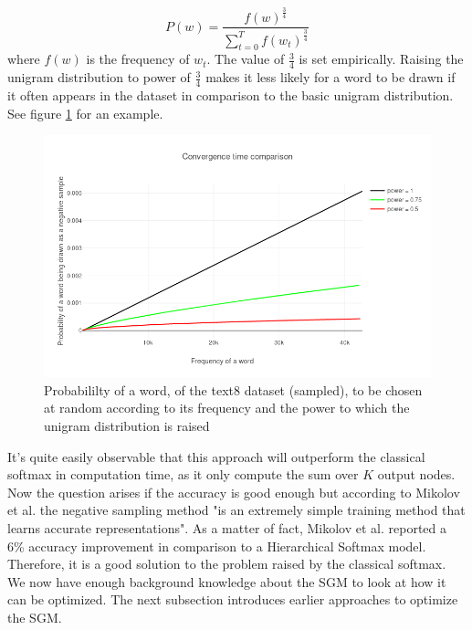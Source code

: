 \begin{equation} \label{eq:unigram}
P(w)=\frac{f(w)^{\frac{3}{4}}}{\sum_{t=0}^{T} f(w_t)^{\frac{3}{4}}}
\end{equation}
where $f(w)$ is the frequency of $w_t$. The value of $\frac{3}{4}$ is set empirically. Raising the unigram distribution to power of $\frac{3}{4}$ makes it less likely for a word to be drawn if it often appears in the dataset in comparison to the basic unigram distribution. See figure \ref{fig:frequency_ex} for an example.
\begin{figure}[ht]
\centering
\includegraphics[scale=0.30]{images/frequency_ex}
\caption{Probabililty of a word, of the text8 dataset (sampled), to be chosen at random according to its frequency and the power to which the unigram distribution is raised}
\label{fig:frequency_ex}
\end{figure}
It's quite easily observable that this approach will outperform the classical softmax in computation time, as it only compute the sum over $K$ output nodes. Now the question arises if the accuracy is good enough but according to Mikolov et al. \cite{mikolov2} the negative sampling method "is an extremely simple training method that learns accurate representations". As a matter of fact, Mikolov et al. \cite{mikolov2} reported a 6\% accuracy improvement in comparison to a Hierarchical Softmax model. Therefore, it is a good solution to the problem raised by the classical softmax.
We now have enough background knowledge about the SGM to look at how it can be optimized. The next subsection introduces earlier approaches to optimize the SGM.